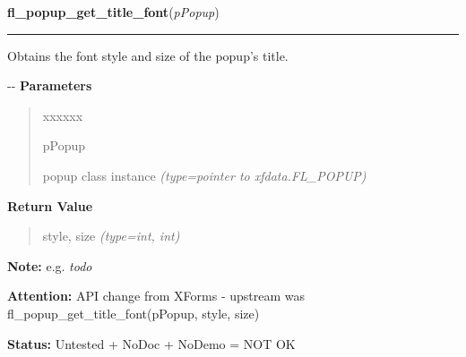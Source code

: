     \label{xformslib:flpopup:fl_popup_get_title_font}

    \vspace{0.5ex}

\hspace{.8\funcindent}\begin{boxedminipage}{\funcwidth}

    \raggedright \textbf{fl\_popup\_get\_title\_font}(\textit{pPopup})

    \vspace{-1.5ex}

    \rule{\textwidth}{0.5\fboxrule}
\setlength{\parskip}{2ex}

Obtains the font style and size of the popup's title.

-{}-
\setlength{\parskip}{1ex}
      \textbf{Parameters}
      \vspace{-1ex}

      \begin{quote}
        \begin{Ventry}{xxxxxx}

          \item[pPopup]


popup class instance
            {\it (type=pointer to xfdata.FL\_POPUP)}

        \end{Ventry}

      \end{quote}

      \textbf{Return Value}
    \vspace{-1ex}

      \begin{quote}

style, size
      {\it (type=int, int)}

      \end{quote}

\textbf{Note:} 
e.g. \emph{todo}


\textbf{Attention:} 
API change from XForms - upstream was
fl\_popup\_get\_title\_font(pPopup, style, size)


\textbf{Status:} 
Untested + NoDoc + NoDemo = NOT OK


    \end{boxedminipage}

    \label{xformslib:flpopup:fl_popup_set_title_font}

